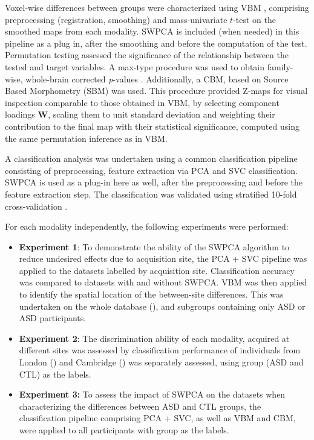 Voxel-wise differences between groups were characterized using \acf{VBM} \cite{Ashburner2000}, comprising preprocessing (registration, smoothing) and mass-univariate $t$-test on the smoothed maps from each modality. \ac{SWPCA} is included (when needed) in this pipeline as a plug in, after the smoothing and before the computation of the test. Permutation testing assessed the significance of the relationship between the tested and target variables. A max-type procedure was used to obtain family-wise, whole-brain corrected \textit{p}{}-values \cite{Freedman1983}. Additionally, a \acf{CBM}, based on Source Based Morphometry (SBM) \cite{Xu2009} was used. This procedure provided Z-maps for visual inspection comparable to those obtained in \ac{VBM}, by selecting component loadings $\mathbf{W}$, scaling them to unit standard deviation and weighting their contribution to the final map with their statistical significance, computed using the same permutation inference as in \ac{VBM}. 

A classification analysis was undertaken using a common classification pipeline \cite{Khedher2015} consisting of preprocessing, feature extraction via \ac{PCA} and \ac{SVC} classification. \ac{SWPCA} is used as a plug-in here as well, after the preprocessing and before the feature extraction step. The classification was validated using stratified 10-fold cross-va\-li\-da\-tion \cite{Kohavi1995}. 

For each modality independently, the following experiments were performed: 
\begin{itemize}
	\item \textbf{Experiment 1}: To demonstrate the ability of the \ac{SWPCA} algorithm	to reduce undesired effects due to acquisition site, the \ac{PCA} + \ac{SVC} pipeline was applied to the datasets labelled by acquisition site. Classification accuracy was compared to datasets with and without \ac{SWPCA}. \ac{VBM} was then applied to identify the spatial location of the between-site differences. This was undertaken on the whole database (\all{}), and subgroups containing only \ac{ASD} or \ac{ASD} participants. 
	
	\item \textbf{Experiment 2}: The discrimination ability of each modality, acquired at different sites was assessed by classification performance of individuals from London (\lon{}) and Cambridge (\cam{}) was separately assessed, using group (\ac{ASD} and \ac{CTL}) as the labels. 
	
	\item \textbf{Experiment 3:} To assess the impact of \ac{SWPCA} on the datasets when characterizing the differences between \ac{ASD} and \ac{CTL} groups, the classification pipeline comprising \ac{PCA} + \ac{SVC}, as well as \ac{VBM} and \ac{CBM}, were applied to all participants with group as the labels.
	
\end{itemize}

